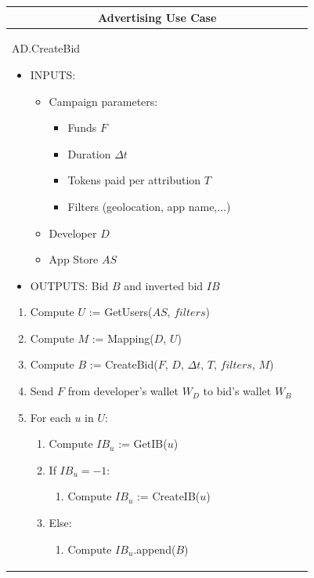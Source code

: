\begin{table}[H]
\scriptsize
\centering
\begin{tabular}{|p{}p{}|}
\hline
\multicolumn{2}{|c|}{Advertising Use Case} \\
\hline \vspace{0.1cm}
\textsf{AD.CreateBid}
\begin{itemize}
	\vspace{-0.3cm}
	\item INPUTS:
	\vspace{-0.4cm}
	\begin{itemize}
		\item Campaign parameters:
		\begin{itemize}
			\item Funds $F$
			\item Duration $\Delta t$
			\item Tokens paid per attribution $T$
			\item Filters (geolocation, app name,...)
		\end{itemize}
		\item Developer $D$
		\item App Store $AS$
	\end{itemize}
	\item OUTPUTS: Bid $B$ and inverted bid $IB$
\end{itemize}
\begin{enumerate}
	\item Compute $U$ := \textsf{GetUsers}($AS$, $filters$)
	\item Compute $M$ := \textsf{Mapping}($D$, $U$)
	\item Compute $B$ := \textsf{CreateBid}($F$, $D$, $\Delta t$, $T$, $filters$, $M$)
	\item Send $F$ from developer's wallet $W_D$ to bid's wallet $W_B$
	\item For each $u$ in $U$:
	\vspace{-0.3cm}
	\begin{enumerate}
		\item Compute $IB_u$ := \textsf{GetIB}($u$)
		\item If $IB_u = -1$: 
		\begin{enumerate}
			\item Compute $IB_u$ := \textsf{CreateIB}($u$)
		\end{enumerate}
		\item Else:
		\begin{enumerate}
		 \item Compute $IB_u$.\textsf{append}($B$)

\end{enumerate}
\end{enumerate}
\end{enumerate}
\end{tabular}
\end{table}
